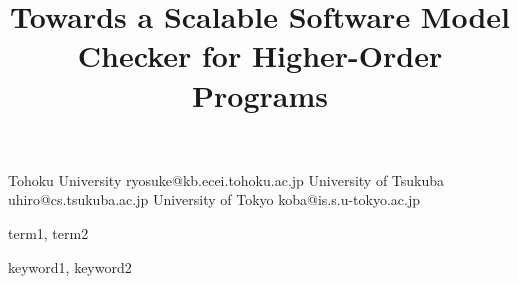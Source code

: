 \documentclass[preprint]{sigplanconf}
\begin{document}
\copyrightdata{[to be supplied]}

\title{Towards a Scalable Software Model Checker for Higher-Order Programs}

           {Tohoku University}
           {ryosuke@kb.ecei.tohoku.ac.jp}
           {University of Tsukuba}
           {uhiro@cs.tsukuba.ac.jp}
           {University of Tokyo}
           {koba@is.s.u-tokyo.ac.jp}

\maketitle




\terms
term1, term2

\keywords
keyword1, keyword2


%













%
\end{document}
